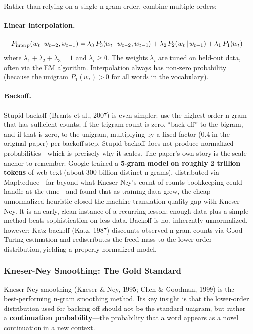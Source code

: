 Rather than relying on a single n-gram order, combine multiple orders:

\paragraph{Linear interpolation.}
\begin{equation}
P_{\text{interp}}(w_t \,|\, w_{t-2}, w_{t-1})
= \lambda_3\, P_3(w_t \,|\, w_{t-2}, w_{t-1})
+ \lambda_2\, P_2(w_t \,|\, w_{t-1})
+ \lambda_1\, P_1(w_t)
\label{eq:interpolation}
\end{equation}
where $\lambda_1 + \lambda_2 + \lambda_3 = 1$ and $\lambda_i \geq 0$.  The
weights $\lambda_i$ are tuned on held-out data, often via the EM algorithm.
Interpolation always has non-zero probability (because the unigram $P_1(w_t) > 0$
for all words in the vocabulary).

\paragraph{Backoff.}
Stupid backoff (Brants et al., 2007) is even simpler: use the highest-order
n-gram that has sufficient counts; if the trigram count is zero, ``back off''
to the bigram, and if that is zero, to the unigram, multiplying by a fixed
factor (0.4 in the original paper) per backoff step.  Stupid backoff does not
produce normalized probabilities---which is precisely why it scales.  The
paper's own story is the scale anchor to remember: Google trained a
\textbf{5-gram model on roughly 2 trillion tokens} of web text (about 300
billion distinct n-grams), distributed via MapReduce---far beyond what
Kneser-Ney's count-of-counts bookkeeping could handle at the time---and found
that as training data grew, the cheap unnormalized heuristic closed the
machine-translation quality gap with Kneser-Ney.  It is an early, clean
instance of a recurring lesson: enough data plus a simple method beats
sophistication on less data.  Backoff is not
inherently unnormalized, however: Katz backoff (Katz, 1987) discounts observed
n-gram counts via Good-Turing estimation and redistributes the freed mass to
the lower-order distribution, yielding a properly normalized model.

\subsubsection{Kneser-Ney Smoothing: The Gold Standard}

Kneser-Ney smoothing (Kneser \& Ney, 1995; Chen \& Goodman, 1999) is the
best-performing n-gram smoothing method.  Its key insight is that the
lower-order distribution used for backing off should not be the standard
unigram, but rather a \textbf{continuation probability}---the probability
that a word appears as a novel continuation in a new context.

